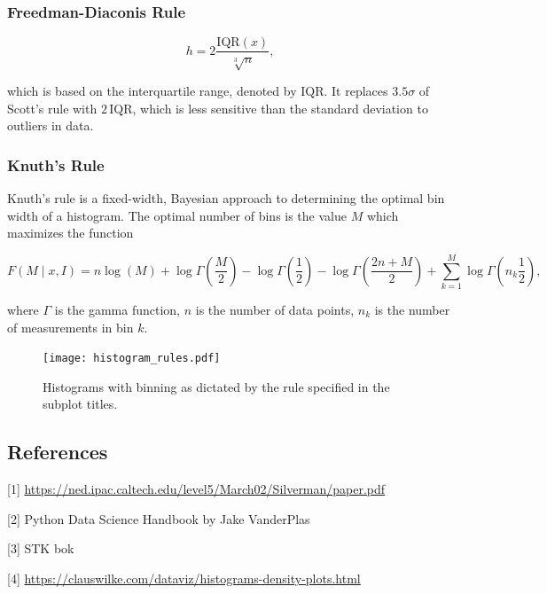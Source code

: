 \subsubsection{Freedman-Diaconis Rule}

\begin{equation}
    h = 2 \frac{\mathrm{IQR}(x)}{\sqrt[3]{n}},
\end{equation}

which is based on the interquartile range, denoted by $\mathrm{IQR}$. It replaces $3.5\sigma$ of Scott's rule with $2\,\mathrm{IQR}$, which is less sensitive than the standard deviation to outliers in data.

\subsubsection{Knuth's Rule}

Knuth's rule is a fixed-width, Bayesian approach to determining the optimal bin width of a histogram. The optimal number of bins is the value $M$ which maximizes the function 

\begin{equation}
    F(M \mid x, I) = n \log(M) + \log \Gamma \left(\frac{M}{2} \right) - \log \Gamma \left(\frac{1}{2} \right) - \log \Gamma \left(\frac{2n + M}{2} \right) + \sum_{k=1}^{M} \log \Gamma \left(n_k \frac{1}{2} \right),
\end{equation}

where $\Gamma$ is the gamma function, $n$ is the number of data points, $n_k$ is the number of measurements in bin $k$.


\begin{figure}[H]
    \centering
    \texttt{[image: histogram\_rules.pdf]}
    \caption{Histograms with binning as dictated by the rule specified in the subplot titles.}
    \label{fig:histogram_rules}
\end{figure}


\subsection*{References}

[1] \url{https://ned.ipac.caltech.edu/level5/March02/Silverman/paper.pdf}

[2] Python Data Science Handbook by Jake VanderPlas

[3] STK bok

[4] \url{https://clauswilke.com/dataviz/histograms-density-plots.html}

